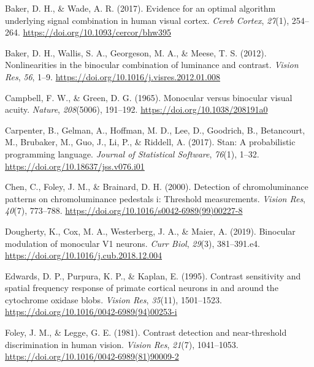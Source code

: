 \documentclass[
]{article}
\newlength{\cslhangindent}
\newlength{\cslentryspacingunit} %
\newenvironment{CSLReferences}[2] %
 {%
  \setlength{\parindent}{0pt}
  \ifodd #1
  \let\oldpar\par
  \def\par{\hangindent=\cslhangindent\oldpar}
  \fi
  \setlength{\parskip}{#2\cslentryspacingunit}
 }%
 {}
\begin{document}
\begin{CSLReferences}{1}{0}
\leavevmode{}%
Baker, D. H., \& Wade, A. R. (2017). Evidence for an optimal algorithm underlying signal combination in human visual cortex. \emph{Cereb Cortex}, \emph{27}(1), 254--264. \url{https://doi.org/10.1093/cercor/bhw395}

\leavevmode{}%
Baker, D. H., Wallis, S. A., Georgeson, M. A., \& Meese, T. S. (2012). Nonlinearities in the binocular combination of luminance and contrast. \emph{Vision Res}, \emph{56}, 1--9. \url{https://doi.org/10.1016/j.visres.2012.01.008}

\leavevmode{}%
Campbell, F. W., \& Green, D. G. (1965). Monocular versus binocular visual acuity. \emph{Nature}, \emph{208}(5006), 191--192. \url{https://doi.org/10.1038/208191a0}

\leavevmode{}%
Carpenter, B., Gelman, A., Hoffman, M. D., Lee, D., Goodrich, B., Betancourt, M., Brubaker, M., Guo, J., Li, P., \& Riddell, A. (2017). Stan: A probabilistic programming language. \emph{Journal of Statistical Software}, \emph{76}(1), 1--32. \url{https://doi.org/10.18637/jss.v076.i01}

\leavevmode{}%
Chen, C., Foley, J. M., \& Brainard, D. H. (2000). Detection of chromoluminance patterns on chromoluminance pedestals i: Threshold measurements. \emph{Vision Res}, \emph{40}(7), 773--788. \url{https://doi.org/10.1016/s0042-6989(99)00227-8}

\leavevmode{}%
Dougherty, K., Cox, M. A., Westerberg, J. A., \& Maier, A. (2019). Binocular modulation of monocular V1 neurons. \emph{Curr Biol}, \emph{29}(3), 381--391.e4. \url{https://doi.org/10.1016/j.cub.2018.12.004}

\leavevmode{}%
Edwards, D. P., Purpura, K. P., \& Kaplan, E. (1995). Contrast sensitivity and spatial frequency response of primate cortical neurons in and around the cytochrome oxidase blobs. \emph{Vision Res}, \emph{35}(11), 1501--1523. \url{https://doi.org/10.1016/0042-6989(94)00253-i}

\leavevmode{}%
Foley, J. M., \& Legge, G. E. (1981). Contrast detection and near-threshold discrimination in human vision. \emph{Vision Res}, \emph{21}(7), 1041--1053. \url{https://doi.org/10.1016/0042-6989(81)90009-2}


\end{CSLReferences}
\end{document}
